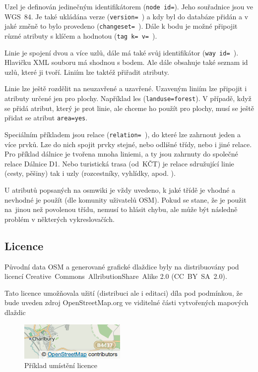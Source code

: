 Uzel je definován jedinečným identifikátorem ({\tt node id=}). Jeho
souřadnice jsou ve WGS~84. Je také ukládána verze ({\tt version= }) a kdy
byl do databáze přidán a v jaké změně to bylo provedeno ({\tt changeset=~}).
Dále k bodu je možné připojit různé atributy s klíčem a hodnotou ({\tt tag~k=~v=~}).

Linie je spojení dvou a více uzlů, dále má také svůj identifikátor ({\tt way~id=~}).
Hlavičku XML souboru má shodnou s bodem. Ale dále obsahuje také seznam id uzlů,
které ji tvoří. Liniím lze taktéž přiřadit atributy.

Linie lze ještě rozdělit na neuzavřené a uzavřené. Uzaveným liniím lze připojit
i atributy určené jen pro plochy. Například les ({\tt landuse=forest}).
V případě, když se přidá atribut, který je prot linie, ale chceme
ho použít pro plochy, musí se ještě přidat se atribut {\tt area=yes}.

Speciálním příkladem jsou relace ({\tt relation= }), do které lze zahrnout
jeden a více prvků. Lze do nich spojit prvky stejné, nebo odlišné třídy,
nebo i jiné relace. Pro příklad dálnice je tvořena mnoha liniemi, a ty
jsou zahrnuty do společné relace Dálnice D1. Nebo turistická trasa
(od~KČT) je relace sdružující linie (cesty, pěšiny) tak i uzly
(rozcestníky, vyhlídky, apod. ).

U atributů popsaných na osmwiki je vždy uvedeno, k jaké třídě je
vhodné a nevhodné je použít (dle komunity uživatelů OSM). Pokud se stane, že je použit
na~jinou než povolenou třídu, nemusí to hlásit chybu, ale může být následně
problém v některých vykreslovačích. \cite{OSMfeatures}

\subsection{Licence}
\label{licence}

Původní data OSM a generované grafické dlaždice
byly na distribuovány pod licencí
Creative~Commons~AllributionShare~Alike 2.0 (CC~BY~SA~2.0).

Tato licence umožňovala užití (distribuci ale i editaci) díla pod podmínkou,
že bude uveden zdroj OpenStreetMap.org ve viditelné části
vytvořených mapových dlaždic \cite{OSMlicence}

  \begin{figure}[hbt]
    \centering
      \includegraphics{./pictures/attribution_example.png}
      \caption{Příklad umístění licence}
      \label{fig:attribution_example}
  \end{figure} 


